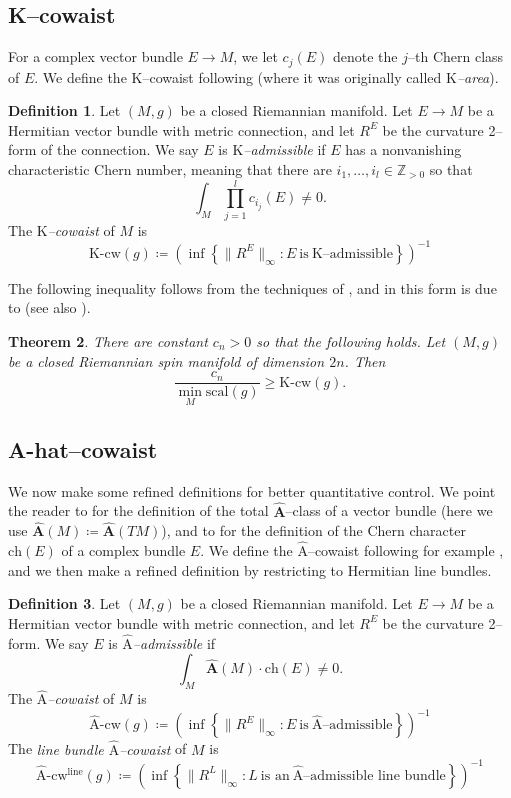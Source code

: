 \documentclass[12pt]{amsart}
\newtheorem{theorem}{Theorem}[section]
\theoremstyle{definition}
\newtheorem{definition}[theorem]{Definition}
\numberwithin{equation}{section}
\newcommand{\Z}{\mathbb{Z}}
\newcommand{\kcw}{\mathrm{K}\text{-}\mathrm{cw}}
\newcommand{\acw}{\hat{\mathrm{A}}\text{-}\mathrm{cw}}
\newcommand{\ahat}{\hat{\mathrm{A}}}
\begin{document}
\subsection{K--cowaist}
For a complex vector bundle $E \to M$, we let $c_j(E)$ denote the $j$--th Chern class of $E$. We define the $\mathrm{K}$--cowaist  following \cite{Gromov:K-area} (where it was originally called \emph{$\mathrm{K}$--area}).

\begin{definition}
Let $(M,g)$ be a closed Riemannian manifold. Let $E \to M$ be a Hermitian vector bundle with metric connection, and let $R^E$ be the curvature 2--form of the connection. We say $E$ is \emph{$\mathrm{K}$--admissible} if $E$ has a nonvanishing characteristic Chern number, meaning that there are $i_1,\hdots, i_l \in \Z_{>0}$ so that
\[ \int_M \prod_{j=1}^l c_{i_j}(E) \neq 0. \]
The \emph{$\mathrm{K}$--cowaist} of $M$ is
\[ \kcw(g) \coloneq \left(\inf\left\{\|R^E\|_{\infty} : E\ \text{is}\ \mathrm{K}\text{--admissible}\right\}\right)^{-1} \]
\end{definition}

The following inequality follows from the techniques of \cite{Gromov-Lawson:closed}, and in this form is due to \cite[Theorem 5$\frac{1}{4}$]{Gromov:K-area} (see also \cite[\S1]{Wang:cowaist}).

\begin{theorem}\label{thm:spin}
There are constant $c_n > 0$ so that the following holds. Let $(M, g)$ be a closed Riemannian spin manifold of dimension $2n$. Then
\[ \frac{c_n}{\min_M \mathrm{scal}(g)} \geq \kcw(g). \]
\end{theorem}


\subsection{A-hat--cowaist}
We now make some refined definitions for better quantitative control. We point the reader to \cite[Chapter III, Example 11.13]{Lawson-Michelson:spin} for the definition of the total $\hat{\mathbf{A}}$--class of a vector bundle (here we use $\hat{\mathbf{A}}(M) \coloneq \hat{\mathbf{A}}(TM)$), and to \cite[Chapter III, (11.22)]{Lawson-Michelson:spin} for the definition of the Chern character $\mathrm{ch}(E)$ of a complex bundle $E$. We define the $\ahat$--cowaist following for example \cite{Wang:cowaist}, and we then make a refined definition by restricting to Hermitian line bundles.

\begin{definition}
Let $(M,g)$ be a closed Riemannian manifold. Let $E \to M$ be a Hermitian vector bundle with metric connection, and let $R^E$ be the curvature 2--form. We say $E$ is \emph{$\ahat$--admissible} if
\[ \int_M \hat{\mathbf{A}}(M) \cdot \mathrm{ch}(E) \neq 0. \]
The \emph{$\ahat$--cowaist} of $M$ is
\[ \acw(g) \coloneq \left(\inf\left\{\|R^E\|_{\infty} : E\ \text{is}\ \ahat\text{--admissible}\right\}\right)^{-1} \]
The \emph{line bundle $\ahat$--cowaist} of $M$ is
\[ \acw^{\mathrm{line}}(g) \coloneq \left(\inf\left\{\|R^L\|_{\infty} : L\ \text{is\ an}\ \ahat\text{--admissible\ line\ bundle}\right\}\right)^{-1} \]
\end{definition}
\end{document}
